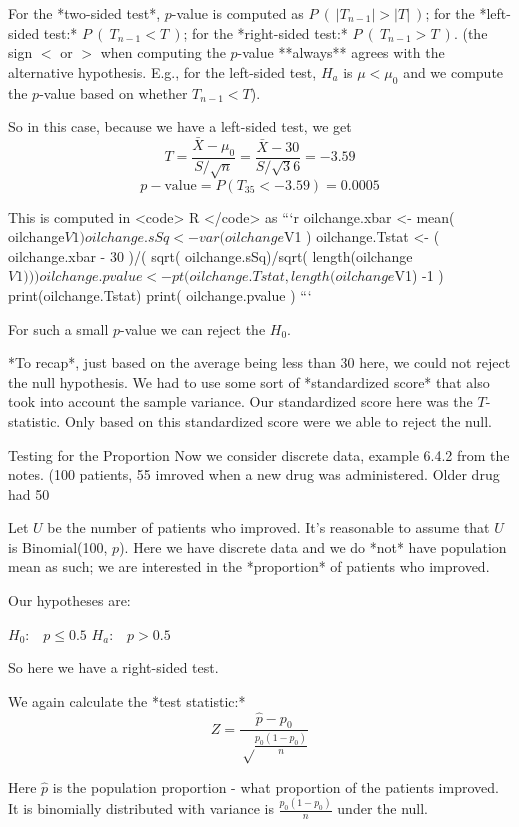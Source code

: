 \documentclass[12pt]{article}
\begin{document}
For the *two-sided test*, $p$-value is computed as $P\ (\ |T_{n-1}| > |T|\ )$; for the *left-sided test:*  $P\ (\ T_{n-1} < T\ )$; for the *right-sided test:* $P\ (\ T_{n-1} > T\ )$. (the sign $<$ or $>$ when computing the $p$-value **always** agrees with the alternative hypothesis. E.g., for the left-sided test, $H_a$ is $\mu < \mu_0$ and we compute the $p$-value based on whether $T_{n-1} < T$).

So in this case, because we have a left-sided test, we get
$$
T = \frac{\bar X - \mu_0}{S/\sqrt n} = \frac{\bar X - 30}{S/\sqrt 36} = -3.59
$$
$$
p-\text{value} = P ( T_{35} < -3.59 ) = 0.0005
$$

This is computed in <code> R </code> as
```{r}
oilchange.xbar <- mean( oilchange$V1 )
oilchange.sSq <- var( oilchange$V1 )
oilchange.Tstat <- ( oilchange.xbar - 30 )/( sqrt( oilchange.sSq)/sqrt( length(oilchange$V1) ) ) 
oilchange.pvalue <- pt( oilchange.Tstat, length(oilchange$V1) -1 )
print(oilchange.Tstat)
print( oilchange.pvalue )
```
  
For such a small $p$-value we can reject the $H_0$. 

*To recap*, just based on the average being less than 30 here, we could not reject the null hypothesis. We had to use some sort of *standardized score* that also took into account the sample variance. Our standardized score here was the $T$-statistic. Only based on this standardized score were we able to reject the null. 

Testing for the Proportion
Now we consider discrete data, example 6.4.2 from the notes. (100 patients, 55 imroved when a new drug was administered. Older drug had 50%

Let $U$ be the number of patients who improved. It's reasonable to assume that $U$ is Binomial(100, $p$). Here we have discrete data and we do *not* have population mean as such; we are interested in the *proportion* of patients who improved. 

Our hypotheses are: 

$H_0: \; \; \; p \leq 0.5$  
$H_a: \; \; \; p   >  0.5$  

So here we have a right-sided test. 

We again calculate the *test statistic:*
$$
Z = \frac{\hat p - p_0}{\sqrt\frac{p_0(1 - p_0)}{n}}
$$

Here $\hat p$ is the population proportion - what proportion of the patients improved. It is binomially distributed with variance is $\frac{p_0(1 - p_0)}{n}$ under the null. 
\end{document}
